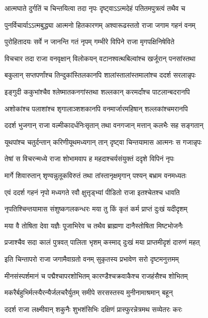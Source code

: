 \twolineshloka
{आत्मघाते दुर्गतिं च चिन्तयित्वा तदा नृपः}
{दृष्ट्वाऽऽत्मदेहं पतितमपुत्रत्वं तथैव च}%

\twolineshloka
{पुनर्विचार्याऽऽत्मबुद्ध्या आत्मनो हितकारणम्}
{अश्वारूढस्ततो राजा जगाम गहनं वनम्}%

\twolineshloka
{पुरोहितादयः सर्वे न जानन्ति गतं नृपम्}
{गम्भीरे विपिने राजा मृगपक्षिनिषेविते}%

\twolineshloka
{विचचार तदा राजा वनवृक्षान् विलोकयन्}
{वटानश्वत्थबिल्वांश्च खर्जूरान् पनसांस्तथा}%

\twolineshloka
{बकुलान् सप्तपर्णांश्च तिन्दुकांस्तिलकानपि}
{शालांस्तालांस्तमालांश्च ददर्श सरलान्नृपः}%

\twolineshloka
{इङ्गुदी ककुभांश्चैव श्लेष्मातकनगांस्तथा}
{शल्लकान् करमर्दांश्च पाटलान्बदरानपि}%

\twolineshloka
{अशोकांश्च पलाशांश्च शृगालाञ्शशकानपि}
{वनमार्जारमहिषान् शल्लकांश्चमरानपि}%

\twolineshloka
{ददर्श भुजगान् राजा वल्मीकादर्धनिःसृतान्}
{तथा वनगजान् मत्तान् कलभैः सह सङ्गतान्}%

\twolineshloka
{यूथपांश्च चतुर्दन्तान् करिणीयूथमध्यगान्}
{तान् दृष्ट्वा चिन्तयामास आत्मनः स गजान्नृपः}%

\twolineshloka
{तेषां स विचरन्मध्ये राजा शोभामवाप ह}
{महदाश्चर्यसंयुक्तं ददृशे विपिनं नृपः}%

\twolineshloka
{मार्गे शिवारुतान् शृण्वन्नुलूकविरुतं तथा}
{तांस्तानृक्षमृगान् पश्यन् बभ्राम वनमध्यतः}%

\twolineshloka
{एवं ददर्श गहनं नृपो मध्यगते रवौ}
{क्षुत्तृड्भ्यां पीडितो राजा इतश्चेतश्च धावति}%

\twolineshloka
{नृपतिश्चिन्तयामास संशुष्कगलकन्धरः}
{मया तु किं कृतं कर्म प्राप्तं दुःखं यदीदृशम्}%

\twolineshloka
{मया वै तोषिता देवा यज्ञैः पूजाभिरेव च}
{तथैव ब्राह्मणा दानैस्तोषिता मिष्टभोजनैः}%

\twolineshloka
{प्रजाश्चैव सदा कालं पुत्रवत् पालिता भृशम्}
{कस्माद् दुःखं मया प्राप्तमीदृशं दारुणं महत्}%

\twolineshloka
{इति चिन्तापरो राजा जगामैवाग्रतो वनम्}
{सुकृतस्य प्रभावेण सरो दृष्टमनुत्तमम्}%

\twolineshloka
{मीनसंस्पर्शमानं च पद्मैश्चापरशोभितम्}
{कारण्डैश्चक्रवाकैश्च राजहंसैश्च शोभितम्}%

\twolineshloka
{मकरैर्बहुभिर्मत्स्यैरन्यैर्जलचरैर्युतम्}
{समीपे सरसस्तस्य मुनीनामाश्रमान् बहून्}%

\twolineshloka
{ददर्श राजा लक्ष्मीवान् शकुनैः शुभशंसिभिः}
{दक्षिणं प्रास्फुरन्नेत्रमथ सव्येतरः करः}%

